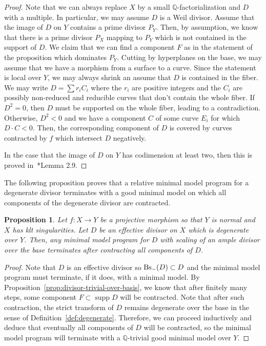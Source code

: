 \documentclass{amsart}
\newcommand{\supp}{\operatorname{supp}}
\renewcommand{\qq}{\mathbb{Q}}
\newtheorem{proposition}[theorem]{Proposition}
\theoremstyle{remark}
\numberwithin{equation}{section}
\begin{document}
\begin{proof}
Note that we can always replace $X$ by a small $\qq$-factorialization and $D$ with a multiple.
In particular, we may assume $D$ is a Weil divisor.
Assume that the image of $D$ on $Y$ contains a prime divisor $P_Y$.
Then, by assumption, we know that there is a prime divisor $P_X$ mapping to $P_Y$ which is not contained in the support of $D$.
We claim that we can find a component $F$ as in the statement of the proposition which dominates $P_Y$.
Cutting by hyperplanes on the base, we may assume that we have a morphism from a surface to a curve.
Since the statement is local over $Y$, we may always shrink an assume that $D$ is contained in the fiber.
We may write $D=\sum r_i C_i$ where the $r_i$ are positive integers and the $C_i$ are possibly non-reduced and reducible curves that don't contain the whole fiber.
If $D^2=0$, then $D$ must be supported on the whole fiber, leading to a contradiction.
Otherwise, $D^2<0$ and we have a component 
$C$ of some curve $E_i$ for which $D\cdot C<0$.
Then, the corresponding component of $D$ is covered by curves contracted by $f$ which intersect $D$ negatively.

In the case that the image of $D$ on $Y$ has codimension at least two, then this is proved in~\cite{Lai11}*{Lemma 2.9}.
\end{proof}

The following proposition proves that a relative minimal model program for a degenerate divisor terminates with a good minimal model on which all components of the degenerate divisor are contracted.

\begin{proposition}\label{prop:MMP-for-deg}
Let $f\colon X\rightarrow Y$ be a projective morphism so that $Y$ is normal and $X$ has klt singularities.
Let $D$ be an effective divisor on $X$ which is degenerate over $Y$.
Then, any minimal model program for $D$ with scaling of an ample divisor over the base terminates after contracting all components of $D$. 
\end{proposition}

\begin{proof}
Note that $D$ is an effective divisor so
${\rm Bs}_{-}(D)\subset D$ and
the minimal model program must terminate, if it does, with a minimal model.
By Proposition~\ref{prop:divisor-trivial-over-basis}, we know that after finitely many steps, some component $F\subset \supp D$ will be contracted.
Note that after such contraction, the strict transform of $D$ remains degenerate over the base in the sense of Definition~\ref{def:degenerate}.
Therefore, we can proceed inductively and deduce that eventually all components of $D$ will be contracted, so the minimal model program will terminate with a $\qq$-trivial good minimal model over $Y$.
\end{proof}
\end{document}
